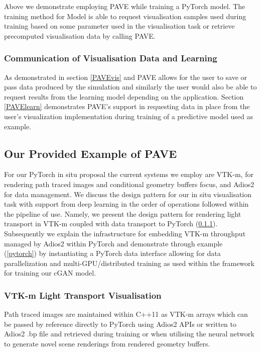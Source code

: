 \documentclass[conference]{IEEEtran}
\begin{document}
Above we demonstrate employing PAVE while training a PyTorch model. The training method for Model is able to request visualisation samples used during training based on some parameter used in the visualisation task or retrieve precomputed visualisation data by calling PAVE.
 
\subsubsection{Communication of Visualisation Data and Learning}

As demonstrated in section \ref{PAVEvis} and PAVE allows for the user to save or pass data produced by the simulation and similarly the user would also be able to request results from the learning model depending on the application. Section \ref{PAVElearn} demonstrates PAVE's support in requesting data in place from the user's visualization implementation during training of a predictive model used as example. 

\subsection{Our Provided Example of PAVE}\label{ex}

For our PyTorch in situ proposal the current systems we employ are VTK-m, for rendering path traced images and conditional geometry buffers focus, and Adios2 for data management. We discuss the design pattern for our in situ visualisation task with support from deep learning in the order of operations followed within the pipeline of use. Namely, we present the design pattern for rendering light transport in VTK-m coupled with data transport to PyTorch (\ref{pathtracer}). Subsequently we explain the infrastructure for embedding VTK-m throughput managed by Adios2 within PyTorch and demonstrate through example (\ref{pytorch}) by  instantiating a PyTorch data interface allowing for data parallelization and multi-GPU/distributed training as used within the framework for training our cGAN model.

\subsubsection{VTK-m Light Transport Visualisation}\label{pathtracer}

Path traced images are maintained within C++11 as VTK-m arrays which can be passed by reference directly to PyTorch using Adios2 APIs or written to Adios2 .bp file and retrieved during training or when utilising the neural network to generate novel scene renderings from rendered geometry buffers. 
\end{document}
